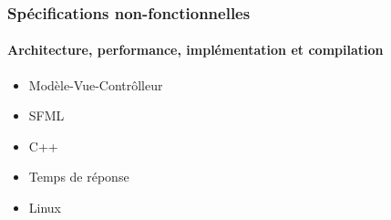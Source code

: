 \begin{frame}
	\frametitle{Spécifications non-fonctionnelles}
	\framesubtitle{Architecture, performance, implémentation et compilation}
	\begin{itemize}
		\item Modèle-Vue-Contrôlleur
	\end{itemize}
	\begin{itemize}
		\item SFML
	\end{itemize}
	\begin{itemize}
		\item C++
	\end{itemize}
	\begin{itemize}
		\item Temps de réponse
	\end{itemize}
	\begin{itemize}
		\item Linux
	\end{itemize}
\end{frame}
